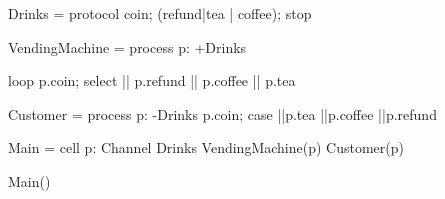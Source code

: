 \begin{code}
Drinks = protocol { coin; (refund|tea | coffee); stop }

VendingMachine = process p: +Drinks
{
    loop{
        p.coin;
        select
	    {
          || p.refund
          || p.coffee
		  || p.tea
	   }
    }

}

Customer = process p: -Drinks
{
        p.coin;
        case{
            ||p.tea
            ||p.coffee
	        ||p.refund
            }
}

Main = cell
{	
	p: Channel Drinks
	VendingMachine(p)
	Customer(p)
}

Main()
\end{code}
